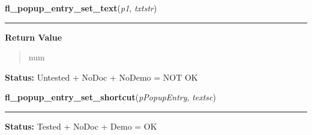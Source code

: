     \label{xformslib:flpopup:fl_popup_entry_set_text}

    \vspace{0.5ex}

\hspace{.8\funcindent}\begin{boxedminipage}{\funcwidth}

    \raggedright \textbf{fl\_popup\_entry\_set\_text}(\textit{p1}, \textit{txtstr})

    \vspace{-1.5ex}

    \rule{\textwidth}{0.5\fboxrule}
\setlength{\parskip}{2ex}
\setlength{\parskip}{1ex}
      \textbf{Return Value}
    \vspace{-1ex}

      \begin{quote}
      num

      \end{quote}

\textbf{Status:} Untested + NoDoc + NoDemo = NOT OK



    \end{boxedminipage}

    \label{xformslib:flpopup:fl_popup_entry_set_shortcut}

    \vspace{0.5ex}

\hspace{.8\funcindent}\begin{boxedminipage}{\funcwidth}

    \raggedright \textbf{fl\_popup\_entry\_set\_shortcut}(\textit{pPopupEntry}, \textit{textsc})

    \vspace{-1.5ex}

    \rule{\textwidth}{0.5\fboxrule}
\setlength{\parskip}{2ex}
\setlength{\parskip}{1ex}
\textbf{Status:} Tested + NoDoc + Demo = OK



    \end{boxedminipage}

    \label{xformslib:flpopup:fl_popup_entry_set_value}

